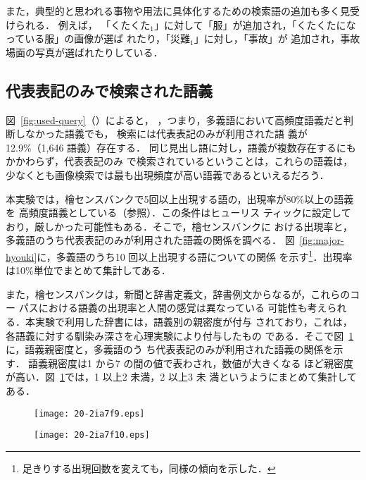 \documentclass[japanese]{jnlp_1.4}
\newcommand{\refsec}[1]{}
\newcommand{\lxd}{}
\newcommand{\MINOR}{}
\newcommand{\gogi}[1]{}
\newcommand{\changed}[1]{}
\begin{document}
\begin{table}[t]
\caption{\changed{画像獲得のために追加された検索語のトップ10}} 
\label{tb:added-queries}

\end{table}

また，典型的と思われる事物や用法に具体化するための検索語の追加も多く見受けられる．
例えば，
「くたくた$_1$」\gogi{布や衣服などが使い古されて，張りを失い弱くなった様
子．}に対して「服」が追加され，「くたくたになっている服」の画像が選ば
れたり，「災難$_1$」\gogi{不意に起こる不幸な出来事．}に対し，「事故」が
追加され，事故場面の写真が選ばれたりしている．



\subsection{代表表記のみで検索された語義}
\label{sec:judge-major}


図~\ref{fig:used-query}（\refsec{sec:ana-query}）によると，
\MINOR{}，つまり，多義語において高頻度語義だと判断しなかった語義でも，
検索には代表表記のみが利用された語
義が12.9\%（1,646 語義）存在する．
同じ見出し語に対し，語義が複数存在するにもかかわらず，代表表記のみ
で検索されているということは，これらの語義は，
少なくとも画像検索では最も出現頻度が高い語義であるといえるだろう．

本実験では，檜センスバンクで5回以上出現する語の，出現率が80\%以上の語義を
高頻度語義としている（\refsec{sec:query-order}参照）．この条件はヒューリス
ティックに設定しており，厳しかった可能性もある．そこで，檜センスバンクに
おける出現率と，多義語のうち代表表記のみが利用された語義の関係を調べる．
図~\ref{fig:major-hyouki}に，多義語のうち10 回以上出現する語についての関係
を示す\footnote{足きりする出現回数を変えても，同様の傾向を示した．}．出現率は10\%単位でまとめて集計してある．

また，檜センスバンクは，新聞と辞書定義文，辞書例文からなるが，これらのコー
パスにおける語義の出現率と人間の感覚は異なっている
可能性も考えられる．本実験で利用した辞書\lxd{}には，語義別の親密度が付与
されており，これは，各語義に対する馴染み深さを心理実験により付与したもの
である．そこで図~\ref{fig:psy-hyouki}に，語義親密度と，多義語のう
ち代表表記のみが利用された語義の関係を示す．
語義親密度は1 から7 の間の値で表わされ，数値が大きくなる
ほど親密度が高い．図~\ref{fig:psy-hyouki}では，1 以上2 未満，2 以上3 未
満というようにまとめて集計してある．

\begin{figure}[b]
\begin{minipage}[t]{183pt}
\setlength{\captionwidth}{181pt}
\texttt{[image: 20-2ia7f9.eps]}
\label{fig:major-hyouki}
\end{minipage}
\hfill
\begin{minipage}[t]{178pt}
\setlength{\captionwidth}{176pt}
\texttt{[image: 20-2ia7f10.eps]}
 \label{fig:psy-hyouki}
 \end{minipage}
\vspace{-1\Cvs}
\end{figure}
\end{document}
